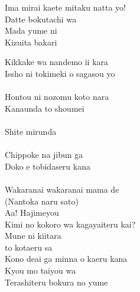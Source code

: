 \def\songtitle{Kimi no Kokoro wa Kagayaiteru kai?}
\def\songcomment{Aqours First Single}
\def\songlyrics{Aki Hata}
\def\songwriter{Hajime Mitsumasu}
\def\songarrange{EFFY}
   
\ifdefined\COMPLETE
\else
	
	
\fi
\thispagestyle{song}

\begin{multicols}{2}\small
Ima mirai kaete mitaku natta yo!\\
Datte bokutachi wa\\
Mada yume ni \\
Kizuita bakari\\


Kikkake wa nandemo ii kara\\
Issho ni tokimeki o sagasou yo\\
\\
Hontou ni nozomu koto nara\\
Kanaunda to shoumei\\
\\
\hspace*{0.66 cm}Shite mirunda\\

\\
Chippoke na jibun ga\\
Doko e tobidaseru kana\\
\\
Wakaranai wakaranai mama de\\
(Nantoka naru sato)\\
Aa! Hajimeyou \\

Kimi no kokoro wa kagayaiteru kai?\\
Mune ni kiitara\\
 to kotaeru sa\\
Kono deai ga minna o kaeru kana\\
Kyou mo taiyou wa\\
Terashiteru  bokura no yume\\

\\



\end{multicols}
